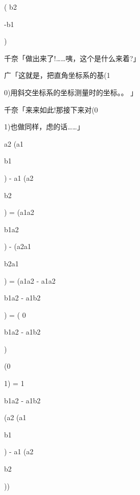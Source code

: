 ( b2\par
-b1\par
)\par
千奈「做出来了!……咦，这个是什么来着?」\par
广「这就是，把直角坐标系的基(1\par
0)用斜交坐标系的坐标测量时的坐标。。 」\par
千奈「来来如此!那接下来对(0\par
1)也做同样，虑的话……」\par
a2 (a1\par
b1\par
) - a1 (a2\par
b2\par
) = (a1a2\par
b1a2\par
) - (a2a1\par
b2a1\par
) = (a1a2 - a1a2\par
b1a2 - a1b2\par
) = ( 0\par
b1a2 - a1b2\par
)\par
(0\par
1) = 1\par
b1a2 - a1b2\par
(a2 (a1\par
b1\par
) - a1 (a2\par
b2\par
))\par

